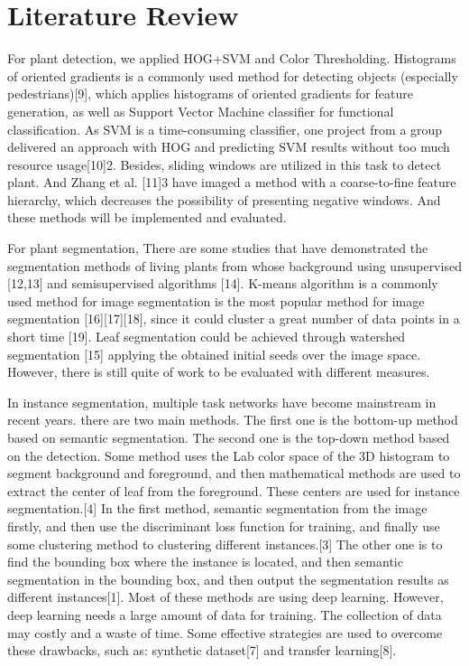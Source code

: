 \documentclass[conference]{IEEEtran}
\begin{document}
\section{Literature Review}
For plant detection, we applied HOG+SVM and Color Thresholding.
Histograms of oriented gradients is a commonly used method for detecting objects (especially pedestrians)[9], which applies histograms of oriented gradients for feature generation, as well as Support Vector Machine classifier for functional classification.
As SVM is a time-consuming classifier, one project from a group delivered an approach with HOG and predicting SVM results without too much resource usage[10]2.
Besides, sliding windows are utilized in this task to detect plant. And Zhang et al. [11]3 have imaged a method with a coarse-to-fine feature hierarchy, which decreases the possibility of presenting negative windows.
And these methods will be implemented and evaluated.

For plant segmentation, There are some studies that have demonstrated the segmentation methods of living plants from whose background using unsupervised [12,13] and semisupervised algorithms [14]. 
K-means algorithm is a commonly used method for image segmentation is the most popular method for image segmentation [16][17][18], since it could cluster a great number of data points in a short time [19].
Leaf segmentation could be achieved through watershed segmentation [15] applying the obtained initial seeds over the image space. 
However, there is still quite of work to be evaluated with different measures.

In instance segmentation, multiple task networks have become mainstream in recent years. there are two main methods. The first one is the bottom-up method based on semantic segmentation. The second one is the top-down method based on the detection. Some method uses the Lab color space of the 3D histogram to segment background and foreground, and then mathematical methods are used to extract the center of leaf from the foreground. These centers are used for instance segmentation.[4] In the first method, semantic segmentation from the image firstly, and then use the discriminant loss function for training, and finally use some clustering method to clustering different instances.[3] The other one is to find the bounding box where the instance is located, and then semantic segmentation in the bounding box, and then output the segmentation results as different instances[1]. Most of these methods are using deep learning. However, deep learning needs a large amount of data for training. The collection of data may costly and a waste of time. Some effective strategies are used to overcome these drawbacks, such as: synthetic dataset[7] and transfer learning[8].
\end{document}
